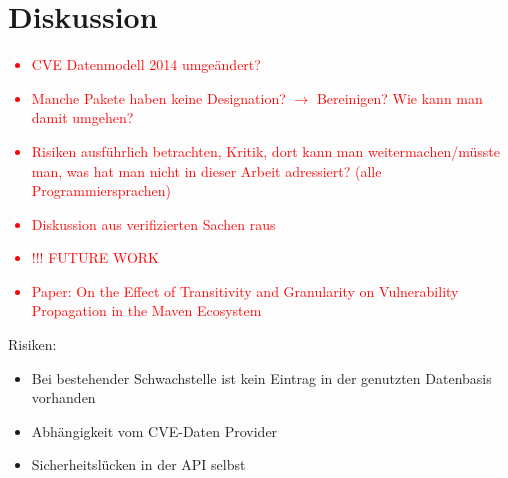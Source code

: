 \section{Diskussion} \label{sec:Diskussion}
    \textcolor{red}{
        \begin{itemize}
            \item CVE Datenmodell 2014 umgeändert?
            \item Manche Pakete haben keine Designation? $\rightarrow$ Bereinigen? Wie kann man damit umgehen?
            \item Risiken ausführlich betrachten, Kritik, dort kann man weitermachen/müsste man, was hat man nicht in dieser Arbeit adressiert? (alle Programmiersprachen)
            \item Diskussion aus verifizierten Sachen raus
            \item !!! FUTURE WORK
            \item Paper: On the Effect of Transitivity and Granularity on Vulnerability Propagation in the Maven Ecosystem
        \end{itemize}
    }
    Risiken:
    \begin{itemize}
        \item Bei bestehender Schwachstelle ist kein Eintrag in der genutzten Datenbasis vorhanden
        \item Abhängigkeit vom CVE-Daten Provider
        \item Sicherheitslücken in der API selbst
    \end{itemize}